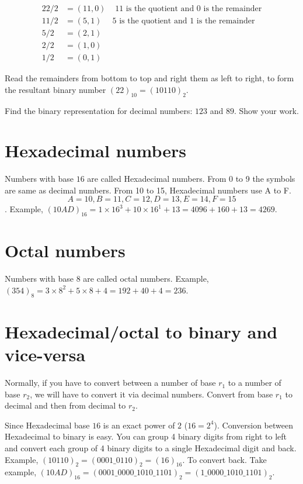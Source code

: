 \begin{align*}
  22 / 2 &= (11, 0) & \text{ 11 is the quotient and 0 is the remainder} \\
  11 / 2 &= (5, 1) & \text{5 is the quotient and 1 is the remainder}\\
  5 / 2 &= (2, 1) & \\ 
  2 / 2 &= (1, 0) & \\
  1 / 2 &= (0, 1) &
\end{align*}

Read the remainders from bottom to top and right them as left to right, to form the resultant binary number $(22)_{10} = (10110)_2$.

\begin{prob}
Find the binary representation for decimal numbers: $123$ and $89$. Show your work.
\end{prob}
\vspace{10em}


\section{Hexadecimal numbers}
Numbers with base $16$ are called Hexadecimal numbers. From 0 to 9 the symbols
are same as decimal numbers. From 10 to 15, Hexadecimal numbers use A to F.
\[ A = 10, B = 11, C = 12, D = 13, E = 14, F = 15 \]. Example, $(10AD)_{16} = 1
\times 16^3 + 10 \times 16^1 + 13 = 4096 + 160 + 13 = 4269$.

\section{Octal numbers}
Numbers with base $8$ are called octal numbers. Example, $(354)_8 = 3 \times 8^2
+ 5 \times 8 + 4 = 192 + 40 + 4 = 236$.



\section{Hexadecimal/octal to binary and vice-versa}
Normally, if you have to convert between a number of base $r_1$ to a number of
base $r_2$, we will have to convert it via decimal numbers. Convert from base
$r_1$ to decimal and then from decimal to $r_2$.

Since Hexadecimal base $16$ is an exact power of $2$ ($16 = 2^4$). Conversion
between Hexadecimal to binary is easy. You can group 4 binary digits from right
to left and convert each group of 4 binary digits to a single Hexadecimal digit
and back. Example, $(10110)_2 = (0001\_0110)_2 = (16)_{16}$. To convert back.
Take example, $(10AD)_{16} = (0001\_0000\_1010\_1101)_2 = (1\_0000\_1010\_1101)_2$.

